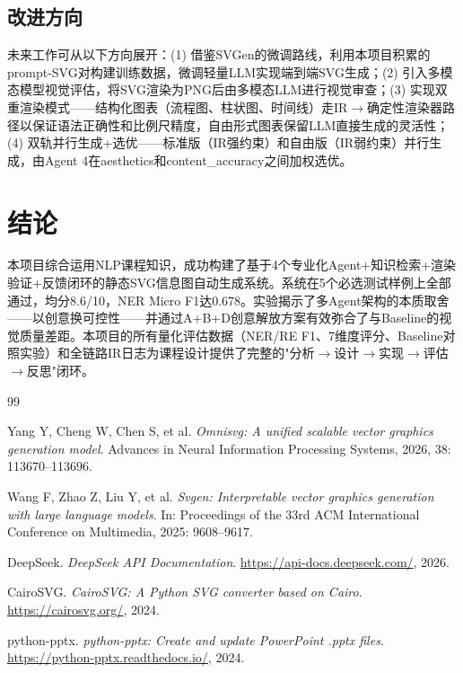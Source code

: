 \documentclass[11pt,a4paper]{article}
\begin{document}
\subsection{改进方向}

未来工作可从以下方向展开：(1) 借鉴SVGen\cite{svgen}的微调路线，利用本项目积累的prompt-SVG对构建训练数据，微调轻量LLM实现端到端SVG生成；(2) 引入多模态模型视觉评估，将SVG渲染为PNG后由多模态LLM进行视觉审查；(3) 实现双重渲染模式——结构化图表（流程图、柱状图、时间线）走IR$\rightarrow$确定性渲染器路径以保证语法正确性和比例尺精度，自由形式图表保留LLM直接生成的灵活性；(4) 双轨并行生成+选优——标准版（IR强约束）和自由版（IR弱约束）并行生成，由Agent 4在aesthetics和content\_accuracy之间加权选优。

\section{结论}

本项目综合运用NLP课程知识，成功构建了基于4个专业化Agent+知识检索+渲染验证+反馈闭环的静态SVG信息图自动生成系统。系统在5个必选测试样例上全部通过，均分8.6/10，NER Micro F1达0.678。实验揭示了多Agent架构的本质取舍——以创意换可控性——并通过A+B+D创意解放方案有效弥合了与Baseline的视觉质量差距。本项目的所有量化评估数据（NER/RE F1、7维度评分、Baseline对照实验）和全链路IR日志为课程设计提供了完整的"分析$\rightarrow$设计$\rightarrow$实现$\rightarrow$评估$\rightarrow$反思"闭环。

\begin{thebibliography}{99}

Yang Y, Cheng W, Chen S, et al.
\textit{Omnisvg: A unified scalable vector graphics generation model}.
Advances in Neural Information Processing Systems, 2026, 38: 113670--113696.

Wang F, Zhao Z, Liu Y, et al.
\textit{Svgen: Interpretable vector graphics generation with large language models}.
In: Proceedings of the 33rd ACM International Conference on Multimedia, 2025: 9608--9617.

DeepSeek. \textit{DeepSeek API Documentation}. \url{https://api-docs.deepseek.com/}, 2026.

CairoSVG. \textit{CairoSVG: A Python SVG converter based on Cairo}. \url{https://cairosvg.org/}, 2024.

python-pptx. \textit{python-pptx: Create and update PowerPoint .pptx files}. \url{https://python-pptx.readthedocs.io/}, 2024.

\end{thebibliography}
\end{document}
